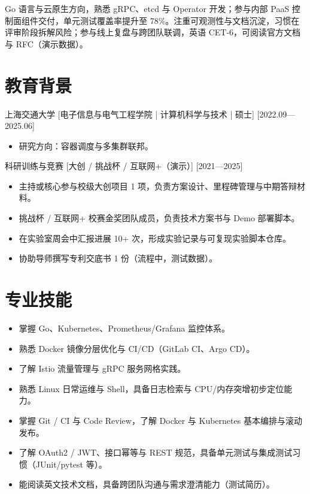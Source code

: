\documentclass{resume-photo}
\begin{document}

\ResumeTitle

\noindent Go 语言与云原生方向，熟悉 gRPC、etcd 与 Operator 开发；参与内部 PaaS 控制面组件交付，单元测试覆盖率提升至 78\%。注重可观测性与文档沉淀，习惯在评审阶段拆解风险；参与线上复盘与跨团队联调，英语 CET-6，可阅读官方文档与 RFC（演示数据）。

\section{教育背景}
\ResumeItem
{上海交通大学}
[\textnormal{电子信息与电气工程学院 | 计算机科学与技术 | 硕士}]
[2022.09—2025.06]

\begin{itemize}
  \item 研究方向：容器调度与多集群联邦。
\end{itemize}


\ResumeItem
{科研训练与竞赛}
[\textnormal{大创 / 挑战杯 / 互联网+（演示）}]
[2021—2025]

\begin{itemize}
  \item 主持或核心参与校级大创项目 1 项，负责方案设计、里程碑管理与中期答辩材料。
  \item 挑战杯 / 互联网+ 校赛金奖团队成员，负责技术方案书与 Demo 部署脚本。
  \item 在实验室周会中汇报进展 10+ 次，形成实验记录与可复现实验脚本仓库。
  \item 协助导师撰写专利交底书 1 份（流程中，测试数据）。
\end{itemize}



\section{专业技能}
\begin{itemize}
  \item 掌握 Go、Kubernetes、Prometheus/Grafana 监控体系。
  \item 熟悉 Docker 镜像分层优化与 CI/CD（GitLab CI、Argo CD）。
  \item 了解 Istio 流量管理与 gRPC 服务网格实践。
  \item 熟悉 Linux 日常运维与 Shell，具备日志检索与 CPU/内存突增初步定位能力。
  \item 掌握 Git / CI 与 Code Review，了解 Docker 与 Kubernetes 基本编排与滚动发布。
  \item 了解 OAuth2 / JWT、接口幂等与 REST 规范，具备单元测试与集成测试习惯（JUnit/pytest 等）。
  \item 能阅读英文技术文档，具备跨团队沟通与需求澄清能力（测试简历）。
\end{itemize}
\end{document}
